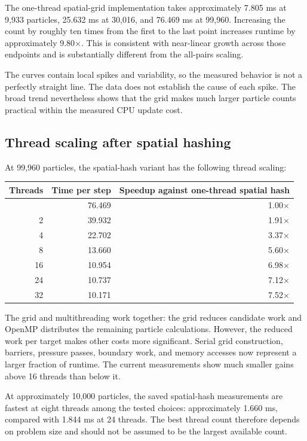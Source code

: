 \documentclass[
  11pt,
]{article}
\newcounter{none} %
\begin{document}
The one-thread spatial-grid implementation takes approximately 7.805 ms
at 9,933 particles, 25.632 ms at 30,016, and 76.469 ms at 99,960.
Increasing the count by roughly ten times from the first to the last
point increases runtime by approximately 9.80×. This is consistent with
near-linear growth across those endpoints and is substantially different
from the all-pairs scaling.

The curves contain local spikes and variability, so the measured
behavior is not a perfectly straight line. The data does not establish
the cause of each spike. The broad trend nevertheless shows that the
grid makes much larger particle counts practical within the measured CPU
update cost.

\subsection{Thread scaling after spatial
hashing}\label{thread-scaling-after-spatial-hashing}

At 99,960 particles, the spatial-hash variant has the following thread
scaling:

{\def\LTcaptype{none} %
\begin{longtable}[]{@{}rrr@{}}
\toprule\noalign{}
Threads & Time per step & Speedup against one-thread spatial hash \\
\midrule\noalign{}
\endhead
\bottomrule\noalign{}
\endlastfoot
1 & 76.469 & 1.00× \\
2 & 39.932 & 1.91× \\
4 & 22.702 & 3.37× \\
8 & 13.660 & 5.60× \\
16 & 10.954 & 6.98× \\
24 & 10.737 & 7.12× \\
32 & 10.171 & 7.52× \\
\end{longtable}
}

The grid and multithreading work together: the grid reduces candidate
work and OpenMP distributes the remaining particle calculations.
However, the reduced work per target makes other costs more significant.
Serial grid construction, barriers, pressure passes, boundary work, and
memory accesses now represent a larger fraction of runtime. The current
measurements show much smaller gains above 16 threads than below it.

At approximately 10,000 particles, the saved spatial-hash measurements
are fastest at eight threads among the tested choices: approximately
1.660 ms, compared with 1.844 ms at 24 threads. The best thread count
therefore depends on problem size and should not be assumed to be the
largest available count.
\end{document}
